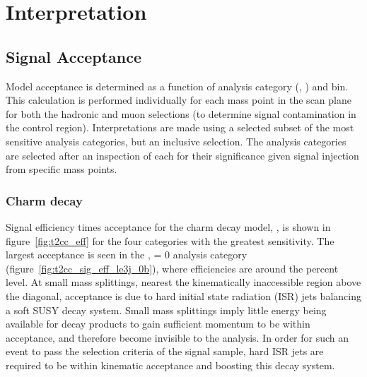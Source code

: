 \chapter{Interpretation}
\label{ch:interpretation}

\ifpdf
    \graphicspath{{Chapter9/Figs/Raster/}{Chapter9/Figs/PDF/}{Chapter9/Figs/}}
\else
    \graphicspath{{Chapter9/Figs/Vector/}{Chapter9/Figs/}}
\fi

\section{Signal Acceptance}  %
\label{sec:interpretation_acceptance}

Model acceptance is determined as a function of analysis category (\nb, \nj) and
\HT bin. This calculation is performed individually for each mass point in the
scan plane for both the hadronic and muon selections (to determine 
signal contamination in the control region). Interpretations are made using a
selected subset of the most sensitive analysis 
categories, but an inclusive \HT selection. The analysis categories are 
selected after an inspection of each for their significance given signal 
injection from specific mass points.

\subsection{Charm decay}
\label{sec:t2cc_eff}
Signal efficiency times acceptance for the charm decay model, \Ttwocc,  is shown
in
figure~\ref{fig:t2cc_eff} for the four categories with the greatest sensitivity.
The largest acceptance is seen in the \njlow, 
\nb= 0 analysis category (figure~\ref{fig:t2cc_sig_eff_le3j_0b}), where efficiencies
are around the percent level. At 
small mass splittings, nearest the kinematically inaccessible region above the diagonal, 
acceptance is due to hard initial state radiation (ISR) jets balancing a soft 
SUSY decay system. Small mass splittings imply little energy being available for
decay products to gain sufficient momentum to be within acceptance, and therefore 
become invisible to the analysis. In order for such an event to pass the 
selection criteria of the signal sample, hard ISR jets are required to be within
kinematic acceptance and boosting this decay system.

